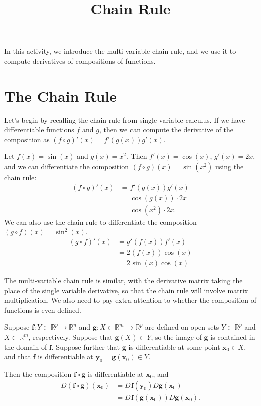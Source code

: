 \documentclass{ximera}
\title{Chain Rule}
\begin{document}
\begin{abstract}
\end{abstract}
\maketitle

In this activity, we introduce the multi-variable chain rule, and we use it to compute derivatives of compositions of functions.

\section{The Chain Rule}

Let's begin by recalling the chain rule from single variable calculus. If we have differentiable functions $f$ and $g$, then we can compute the derivative of the composition as $(f\circ g)'(x) =f'(g(x))g'(x)$.

\begin{example}
Let $f(x) = \sin(x)$ and $g(x) = x^2$. Then $f'(x) = \cos(x)$, $g'(x)=2x$, and we can differentiate the composition $(f\circ g)(x) = \sin(x^2)$ using the chain rule:
\begin{align*}
(f\circ g)'(x) &= f'(g(x))g'(x)\\
&=\cos(g(x))\cdot 2x\\
&=\cos(x^2)\cdot 2x.
\end{align*}
We can also use the chain rule to differentiate the composition $(g\circ f)(x) = \sin^2(x)$.
\begin{align*}
(g\circ f)'(x) &= g'(f(x))f'(x)\\
&=2(f(x))\cos(x)\\
&=2\sin(x)\cos(x)
\end{align*}
\end{example}
 
 The multi-variable chain rule is similar, with the derivative matrix taking the place of the single variable derivative, so that the chain rule will involve matrix multiplication. We also need to pay extra attention to whether the composition of functions is even defined.
 
 \begin{theorem}
 Suppose $\mathbf{f}:Y\subset\mathbb{R}^p\rightarrow\mathbb{R}^n$ and $\mathbf{g}:X\subset\mathbb{R}^m\rightarrow\mathbb{R}^p$ are defined on open sets $Y\subset\mathbb{R}^p$ and $X\subset\mathbb{R}^m$, respectively. Suppose that $\mathbf{g}(X)\subset Y$, so the image of $\mathbf{g}$ is contained in the domain of $\mathbf{f}$. Suppose further that $\mathbf{g}$ is differentiable at some point $\mathbf{x}_0\in X$, and that $\mathbf{f}$ is differentiable at $\mathbf{y}_0=\mathbf{g}(\mathbf{x}_0)\in Y$.
 
 Then the composition $\mathbf{f}\circ\mathbf{g}$ is differentiable at $\mathbf{x}_0$, and 
 \begin{align*}
 D(\mathbf{f}\circ\mathbf{g})(\mathbf{x}_0) &= D\mathbf{f}(\mathbf{y}_0)D\mathbf{g}(\mathbf{x}_0)\\
 &= D\mathbf{f}(\mathbf{g}(\mathbf{x}_0))D\mathbf{g}(\mathbf{x}_0).
 \end{align*}
 \end{theorem}
 
\end{document}
